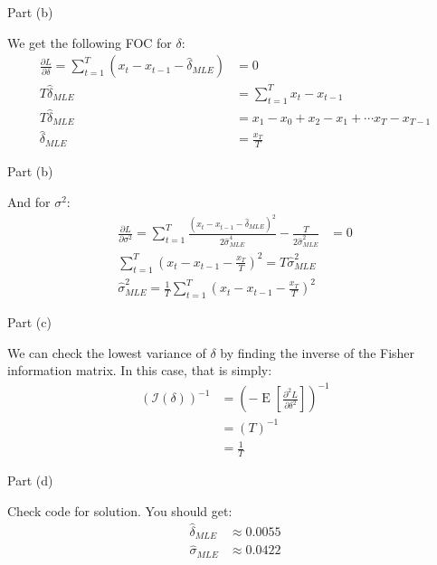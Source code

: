 \begin{frame}{Part (b)}
    
    We get the following FOC for $\delta$:
    \begin{align*}
        \frac{\partial L}{\partial \delta} = \sum_{t=1}^T (x_t - x_{t-1} - \hat{\delta}_{MLE}) &= 0
        \\
        T \hat{\delta}_{MLE} &= \sum_{t=1}^T x_t - x_{t-1}
        \\
        T \hat{\delta}_{MLE} &= x_1 - x_0 + x_2 - x_1 + \cdots x_T - x_{T-1}
        \\
        \hat{\delta}_{MLE} &= \frac{x_T}{T}
    \end{align*}
    
\end{frame}

\begin{frame}{Part (b)}
    
    And for $\sigma^2$:
    \begin{align*}
        \frac{\partial L}{\partial \sigma^2} = \sum_{t=1}^T \frac{(x_t - x_{t-1} - \hat{\delta}_{MLE})^2}{2 \hat{\sigma}_{MLE}^4} - \frac{T}{2 \hat{\sigma}_{MLE}^2} &= 0
        \\
        \sum_{t=1}^T (x_t - x_{t-1} - \frac{x_T}{T})^2 = T \hat{\sigma}_{MLE}^2
        \\
        \hat{\sigma}_{MLE}^2 = \frac{1}{T} \sum_{t=1}^T (x_t - x_{t-1} - \frac{x_T}{T})^2
    \end{align*}
    
\end{frame}

\begin{frame}{Part (c)}
    
    We can check the lowest variance of $\delta$ by finding the inverse of the Fisher information matrix. In this case, that is simply:
    \begin{align*}
        \left( \mathcal{I}(\delta) \right)^{-1} &= \left( - \operatorname{E}\left[ \frac{\partial^2 L}{\partial \delta^2} \right] \right)^{-1}
        \\
        &= \left( T \right)^{-1}
        \\
        &= \frac{1}{T}
    \end{align*}
    
\end{frame}

\begin{frame}{Part (d)}
    
    Check code for solution. You should get:
    \begin{align*}
        \hat{\delta}_{MLE} &\approx 0.0055
        \\
        \hat{\sigma}_{MLE} &\approx 0.0422
    \end{align*}
    
\end{frame}

